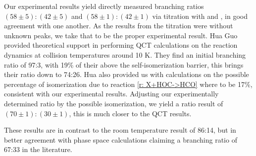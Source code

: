 Our experimental results yield directly measured branching ratios $(58\pm5):(42\pm5)$ and $(58\pm1):(42\pm1)$ via titration with  and , in good agreement with one another. As the results from the  titration were without unknown peaks, we take that to be the proper experimental result. Hua Guo provided theoretical support in performing QCT calculations on the  reaction dynamics at collision temperatures around 10 K. They find an initial branching ratio of 97:3, with 19\% of their  above the self-isomerization barrier, this brings their ratio down to 74:26. Hua also provided us with calculations on the possible percentage of isomerization due to reaction \ref{r: X+HOC->HCO} where  to be 17\%, consistent with our experimental results. Adjusting our experimentally determined ratio by the possible isomerization, we yield a ratio result of $(70\pm1):(30\pm1)$, this is much closer to the QCT results.

These results are in contrast to the room temperature result of 86:14\cite{Love1987}, but in better agreement with phase space calculations claiming a branching ratio of 67:33 in the literature.\cite{DeFrees1984}